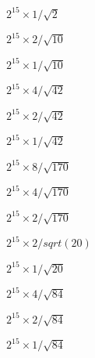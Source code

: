\documentclass{article}
\begin{document}
$ 2^15 \times 1/\sqrt{2}$
\pagebreak

$ 2^{15} \times 2/\sqrt{10}$
\pagebreak

$ 2^{15} \times 1/\sqrt{10}$
\pagebreak

$ 2^{15} \times 4/\sqrt{42}$
\pagebreak

$ 2^{15} \times 2/\sqrt{42}$
\pagebreak

$ 2^{15} \times 1/\sqrt{42}$
\pagebreak

$ 2^{15} \times 8/\sqrt{170}$
\pagebreak

$ 2^{15} \times 4/\sqrt{170}$
\pagebreak

$ 2^{15} \times 2/\sqrt{170}$
\pagebreak

$ 2^{15} \times 2/sqrt(20)$
\pagebreak

$ 2^{15} \times 1/\sqrt{20}$
\pagebreak

$ 2^{15} \times 4/\sqrt{84}$
\pagebreak

$ 2^{15} \times 2/\sqrt{84}$
\pagebreak

$ 2^{15} \times 1/\sqrt{84}$
\pagebreak
\end{document}
